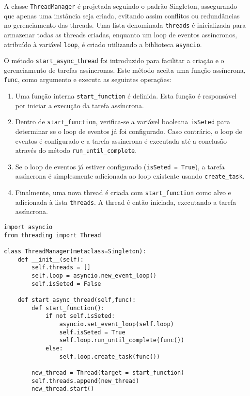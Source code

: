 A classe \texttt{ThreadManager} é projetada seguindo o padrão Singleton, assegurando que apenas uma instância seja criada, evitando assim conflitos ou redundâncias no gerenciamento das threads. Uma lista denominada \texttt{threads} é inicializada para armazenar todas as threads criadas, enquanto um loop de eventos assíncronos, atribuído à variável \texttt{loop}, é criado utilizando a biblioteca \texttt{asyncio}.

O método \texttt{start\_async\_thread} foi introduzido para facilitar a criação e o gerenciamento de tarefas assíncronas. Este método aceita uma função assíncrona, \texttt{func}, como argumento e executa as seguintes operações:

\begin{enumerate}
    \item Uma função interna \texttt{start\_function} é definida. Esta função é responsável por iniciar a execução da tarefa assíncrona.
    \item Dentro de \texttt{start\_function}, verifica-se a variável booleana \texttt{isSeted} para determinar se o loop de eventos já foi configurado. Caso contrário, o loop de eventos é configurado e a tarefa assíncrona é executada até a conclusão através do método \texttt{run\_until\_complete}.
    \item Se o loop de eventos já estiver configurado (\texttt{isSeted = True}), a tarefa assíncrona é simplesmente adicionada ao loop existente usando \texttt{create\_task}.
    \item Finalmente, uma nova thread é criada com \texttt{start\_function} como alvo e adicionada à lista \texttt{threads}. A thread é então iniciada, executando a tarefa assíncrona.
\end{enumerate}

\begin{verbatim}
import asyncio
from threading import Thread

class ThreadManager(metaclass=Singleton):
    def __init__(self):
        self.threads = []
        self.loop = asyncio.new_event_loop()
        self.isSeted = False

    def start_async_thread(self,func):
        def start_function():
            if not self.isSeted:
                asyncio.set_event_loop(self.loop)
                self.isSeted = True
                self.loop.run_until_complete(func())
            else:
                self.loop.create_task(func())

        new_thread = Thread(target = start_function)
        self.threads.append(new_thread)
        new_thread.start()
\end{verbatim}

